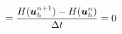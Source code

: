 \documentclass[preview]{standalone}
\newcommand{\bu}{\boldsymbol{u}_h}
\begin{document}
\begin{align*}
\special{dvisvgm:raw <g id='unique000'>}=\frac{H(\bu^{n+1})-H(\bu^n)}{\Delta t}=0\special{dvisvgm:raw </g>}
\end{align*}
\end{document}
